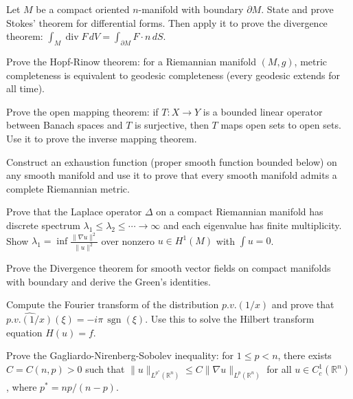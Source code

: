 \documentclass[12pt,a4paper]{exam}
\begin{document}
\begin{questions}
\question[4]
Let $M$ be a compact oriented $n$-manifold with boundary $\partial M$. State and prove Stokes' theorem for differential forms. Then apply it to prove the divergence theorem: $\int_M \operatorname{div} F \, dV = \int_{\partial M} F \cdot n \, dS$.

\vspace{0.3cm}

\question[2]
Prove the Hopf-Rinow theorem: for a Riemannian manifold $(M,g)$, metric completeness is equivalent to geodesic completeness (every geodesic extends for all time).

\vspace{0.3cm}

\question[4]
Prove the open mapping theorem: if $T: X \to Y$ is a bounded linear operator between Banach spaces and $T$ is surjective, then $T$ maps open sets to open sets. Use it to prove the inverse mapping theorem.

\vspace{0.3cm}

\question[5]
Construct an exhaustion function (proper smooth function bounded below) on any smooth manifold and use it to prove that every smooth manifold admits a complete Riemannian metric.

\vspace{0.3cm}

\question[5]
Prove that the Laplace operator $\Delta$ on a compact Riemannian manifold has discrete spectrum $\lambda_1 \leq \lambda_2 \leq \cdots \to \infty$ and each eigenvalue has finite multiplicity. Show $\lambda_1 = \inf \frac{\|\nabla u\|^2}{\|u\|^2}$ over nonzero $u \in H^1(M)$ with $\int u = 0$.

\vspace{0.3cm}

\question[3]
Prove the Divergence theorem for smooth vector fields on compact manifolds with boundary and derive the Green's identities.

\vspace{0.3cm}

\question[4]
Compute the Fourier transform of the distribution $p.v.(1/x)$ and prove that $\widehat{p.v.(1/x)}(\xi) = -i\pi \, \operatorname{sgn}(\xi)$. Use this to solve the Hilbert transform equation $H(u) = f$.

\vspace{0.3cm}

\question[3]
Prove the Gagliardo-Nirenberg-Sobolev inequality: for $1 \leq p < n$, there exists $C = C(n,p) > 0$ such that $\|u\|_{L^{p^*}(\mathbb{R}^n)} \leq C \|\nabla u\|_{L^p(\mathbb{R}^n)}$ for all $u \in C_c^1(\mathbb{R}^n)$, where $p^* = np/(n-p)$.


\end{questions}
\end{document}
